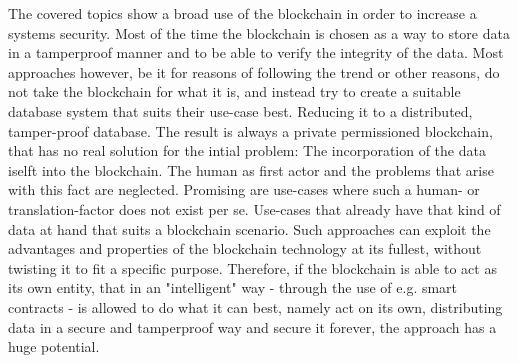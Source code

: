 The covered topics show a broad use of the blockchain in order to increase a systems security. Most of the time the blockchain is chosen as a way to store data in a tamperproof manner and to be able to verify the integrity of the data. 
Most approaches however, be it for reasons of following the trend or other reasons, do not take the blockchain for what it is, and instead try to create a suitable database system that suits their use-case best. Reducing it to a distributed, tamper-proof database. The result is always a private permissioned blockchain, that has no real solution for the intial problem: The incorporation of the data iselft into the blockchain. The human as first actor and the problems that arise with this fact are neglected.
Promising are use-cases where such a human- or translation-factor does not exist per se. Use-cases that already have that kind of data at hand that suits a blockchain scenario. Such approaches can exploit the advantages and properties of the blockchain technology at its fullest, without twisting it to fit a specific purpose.
Therefore, if the blockchain is able to act as its own entity, that in an "intelligent" way - through the use of e.g. smart contracts - is allowed to do what it can best, namely act on its own, distributing data in a secure and tamperproof way and secure it forever, the approach has a huge potential. 